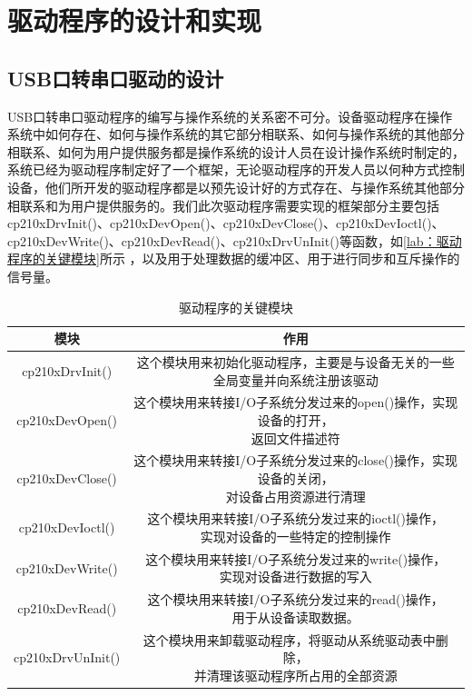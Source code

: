 \chapter{驱动程序的设计和实现}
	
\section{USB口转串口驱动的设计}

	USB口转串口驱动程序的编写与操作系统的关系密不可分。设备驱动程序在操作系统中如何存在、如何与操作系统的其它部分相联系、如何与操作系统的其他部分相联系、如何为用户提供服务都是操作系统的设计人员在设计操作系统时制定的，系统已经为驱动程序制定好了一个框架，无论驱动程序的开发人员以何种方式控制设备，他们所开发的驱动程序都是以预先设计好的方式存在、与操作系统其他部分相联系和为用户提供服务的\cite{徐媛媛2003嵌入式实时操作系统的设备驱动}。我们此次驱动程序需要实现的框架部分主要包括cp210xDrvInit()、cp210xDevOpen()、cp210xDevClose()、cp210xDevIoctl()、cp210xDevWrite()、cp210xDevRead()、cp210xDrvUnInit()等函数，如\autoref{lab：驱动程序的关键模块}所示 ，以及用于处理数据的缓冲区、用于进行同步和互斥操作的信号量。
\begin{table}[!h]
\centering
\begin{tabular}{|c|c|}
\hline
{模块} & {作用} \\
\hline
{cp210xDrvInit()} & \tabincell{c}{这个模块用来初始化驱动程序，主要是与设备无关的一些\\全局变量并向系统注册该驱动} \\
\hline
{cp210xDevOpen()} & \tabincell{c}{这个模块用来转接I/O子系统分发过来的open()操作，实现设备的打开，\\返回文件描述符} \\
\hline
{cp210xDevClose()} & \tabincell{c}{这个模块用来转接I/O子系统分发过来的close()操作，实现设备的关闭，\\对设备占用资源进行清理} \\
\hline
{cp210xDevIoctl()} & \tabincell{c}{这个模块用来转接I/O子系统分发过来的ioctl()操作，\\实现对设备的一些特定的控制操作} \\
\hline
{cp210xDevWrite()} & \tabincell{c}{这个模块用来转接I/O子系统分发过来的write()操作，\\实现对设备进行数据的写入} \\
\hline
{cp210xDevRead()} & \tabincell{c}{这个模块用来转接I/O子系统分发过来的read()操作，\\用于从设备读取数据。} \\
\hline
{cp210xDrvUnInit()} & \tabincell{c}{这个模块用来卸载驱动程序，将驱动从系统驱动表中删除，\\并清理该驱动程序所占用的全部资源} \\
\hline
\end{tabular} 
\caption{驱动程序的关键模块}\label{lab：驱动程序的关键模块}
\end{table}
	
